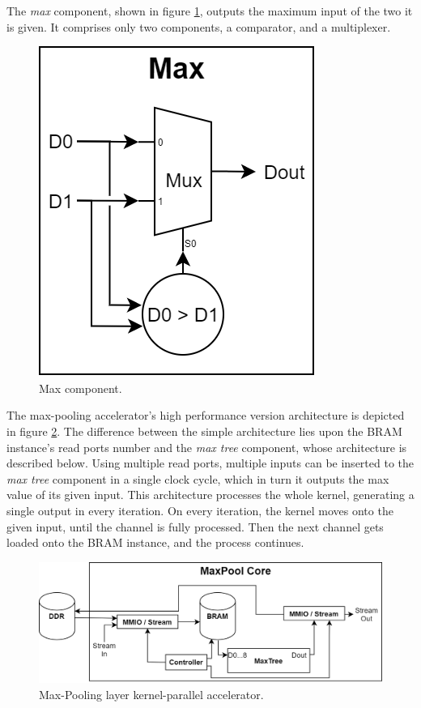 The \emph{max} component, shown in figure \ref{fig:max-component}, outputs the maximum input of the two it is given. It comprises only two components, a comparator, and a multiplexer.

\begin{figure} [H]
	\centering
	\includegraphics[scale=0.4]{../Images/Platform/Max_component.png}
	\decoRule
	\caption[Max component]{Max component.}
	\label{fig:max-component}
\end{figure}

The max-pooling accelerator's high performance version architecture is depicted in figure \ref{fig:max-pool-core-kernel-parallel}. The difference between the simple architecture lies upon the BRAM instance's read ports number and the \emph{max tree} component, whose architecture is described below. Using multiple read ports, multiple inputs can be inserted to the \emph{max tree} component in a single clock cycle, which in turn it outputs the max value of its given input. This architecture processes the whole kernel, generating a single output in every iteration. On every iteration, the kernel moves onto the given input, until the channel is fully processed. Then the next channel gets loaded onto the BRAM instance, and the process continues.

\begin{figure} [H]
	\centering
	\includegraphics[width=\textwidth]{../Images/Platform/MaxPool_core_kernel_parallel.png}
	\decoRule
	\caption[Max-Pooling layer kernel-parallel accelerator]{Max-Pooling layer kernel-parallel accelerator.}
	\label{fig:max-pool-core-kernel-parallel}
\end{figure}

